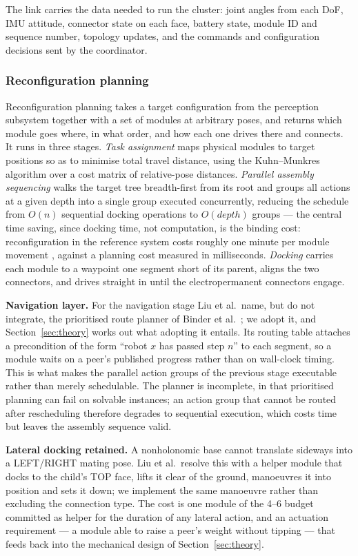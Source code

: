 \documentclass[11pt,a4paper]{article}
\newcounter{gsub}
\newcommand{\gsubsub}[1]{\subsubsection*{#1}}
\begin{document}
The link carries the data needed to run the cluster: joint angles from each
DoF, IMU attitude, connector state on each face, battery state, module ID and
sequence number, topology updates, and the commands and configuration decisions
sent by the coordinator.

\gsubsub{Reconfiguration planning}

Reconfiguration planning takes a target configuration from the perception
subsystem together with a set of modules at arbitrary poses, and returns which
module goes where, in what order, and how each one drives there and connects.
It runs in three stages. \emph{Task assignment} maps physical modules to target
positions so as to minimise total travel distance, using the Kuhn--Munkres
algorithm over a cost matrix of relative-pose distances. \emph{Parallel
assembly sequencing} walks the target tree breadth-first from its root and
groups all actions at a given depth into a single group executed concurrently,
reducing the schedule from $O(n)$ sequential docking operations to $O(depth)$
groups --- the central time saving, since docking time, not computation, is the
binding cost: reconfiguration in the reference system costs roughly one minute
per module movement \cite{daudelin2018}, against a planning cost measured in
milliseconds. \emph{Docking} carries each module to a waypoint one segment
short of its parent, aligns the two connectors, and drives straight in until
the electropermanent connectors engage.

\medskip
\noindent\textbf{Navigation layer.} For the navigation stage Liu et al.\ name,
but do not integrate, the prioritised route planner of Binder et al.\
\cite{binder2019}; we adopt it, and Section~\ref{sec:theory} works out what adopting it entails.
Its routing table attaches a precondition of the form ``robot $x$ has passed
step $n$'' to each segment, so a module waits on a peer's published progress
rather than on wall-clock timing. This is what makes the parallel action groups
of the previous stage executable rather than merely schedulable. The planner is
incomplete, in that prioritised planning can fail on solvable instances; an
action group that cannot be routed after rescheduling therefore degrades to
sequential execution, which costs time but leaves the assembly sequence valid.

\medskip
\noindent\textbf{Lateral docking retained.} A nonholonomic base cannot
translate sideways into a LEFT/RIGHT mating pose. Liu et al.\ resolve this with
a helper module that docks to the child's TOP face, lifts it clear of the
ground, manoeuvres it into position and sets it down; we implement the same
manoeuvre rather than excluding the connection type. The cost is one module of
the 4--6 budget committed as helper for the duration of any lateral action, and
an actuation requirement --- a module able to raise a peer's weight without
tipping --- that feeds back into the mechanical design of
Section~\ref{sec:theory}.
\end{document}
